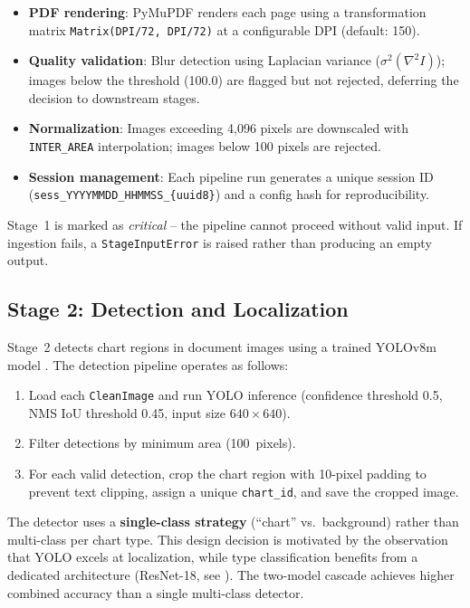 \begin{itemize}
    \item \textbf{PDF rendering}: PyMuPDF renders each page using a transformation matrix
          \texttt{Matrix(DPI/72, DPI/72)} at a configurable DPI (default: 150).
    \item \textbf{Quality validation}: Blur detection using Laplacian variance
          ($\sigma^2(\nabla^2 I)$); images below the threshold (100.0) are flagged but
          not rejected, deferring the decision to downstream stages.
    \item \textbf{Normalization}: Images exceeding 4,096 pixels are downscaled with
          \texttt{INTER\_AREA} interpolation; images below 100 pixels are rejected.
    \item \textbf{Session management}: Each pipeline run generates a unique session ID
          (\texttt{sess\_YYYYMMDD\_HHMMSS\_\{uuid8\}}) and a config hash for
          reproducibility.
\end{itemize}

Stage~1 is marked as \emph{critical} -- the pipeline cannot proceed without valid input.
If ingestion fails, a \texttt{StageInputError} is raised rather than producing an
empty output.

\subsection{Stage 2: Detection and Localization}

Stage~2 detects chart regions in document images using a trained YOLOv8m model
\cite{jocher2023yolov8}. The detection pipeline operates as follows:

\begin{enumerate}
    \item Load each \texttt{CleanImage} and run YOLO inference (confidence threshold 0.5,
          NMS IoU threshold 0.45, input size $640 \times 640$).
    \item Filter detections by minimum area (100~pixels).
    \item For each valid detection, crop the chart region with 10-pixel padding to prevent
          text clipping, assign a unique \texttt{chart\_id}, and save the cropped image.
\end{enumerate}

The detector uses a \textbf{single-class strategy} (``chart'' vs.\ background) rather
than multi-class per chart type. This design decision is motivated by the observation
that YOLO excels at localization, while type classification benefits from a dedicated
architecture (ResNet-18, see ). The two-model cascade achieves
higher combined accuracy than a single multi-class detector.

